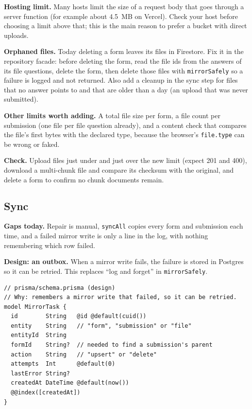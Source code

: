 \documentclass[11pt,a4paper]{article}
\begin{document}
\textbf{Hosting limit.} Many hosts limit the size of a request body that goes through a server function (for example about 4.5~MB on Vercel). Check your host before choosing a limit above that; this is the main reason to prefer a bucket with direct uploads.

\textbf{Orphaned files.} Today deleting a form leaves its files in Firestore. Fix it in the repository facade: before deleting the form, read the file ids from the answers of its file questions, delete the form, then delete those files with \texttt{mirrorSafely} so a failure is logged and not returned. Also add a cleanup in the sync step for files that no answer points to and that are older than a day (an upload that was never submitted).

\textbf{Other limits worth adding.} A total file size per form, a file count per submission (one file per file question already), and a content check that compares the file's first bytes with the declared type, because the browser's \texttt{file.type} can be wrong or faked.

\textbf{Check.} Upload files just under and just over the new limit (expect 201 and 400), download a multi-chunk file and compare its checksum with the original, and delete a form to confirm no chunk documents remain.

\subsection{Sync}
\textbf{Gaps today.} Repair is manual, \texttt{syncAll} copies every form and submission each time, and a failed mirror write is only a line in the log, with nothing remembering which row failed.

\textbf{Design: an outbox.} When a mirror write fails, the failure is stored in Postgres so it can be retried. This replaces ``log and forget'' in \texttt{mirrorSafely}.

\begin{lstlisting}
// prisma/schema.prisma (design)
// Why: remembers a mirror write that failed, so it can be retried.
model MirrorTask {
  id        String   @id @default(cuid())
  entity    String   // "form", "submission" or "file"
  entityId  String
  formId    String?  // needed to find a submission's parent
  action    String   // "upsert" or "delete"
  attempts  Int      @default(0)
  lastError String?
  createdAt DateTime @default(now())
  @@index([createdAt])
}
\end{lstlisting}
\end{document}
